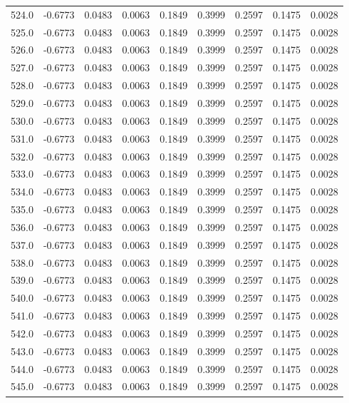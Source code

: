 \begin{longtable}{lrrrrrrrr}
524.0 & -0.6773 & 0.0483 & 0.0063 & 0.1849 & 0.3999 & 0.2597 & 0.1475 & 0.0028 \\
525.0 & -0.6773 & 0.0483 & 0.0063 & 0.1849 & 0.3999 & 0.2597 & 0.1475 & 0.0028 \\
526.0 & -0.6773 & 0.0483 & 0.0063 & 0.1849 & 0.3999 & 0.2597 & 0.1475 & 0.0028 \\
527.0 & -0.6773 & 0.0483 & 0.0063 & 0.1849 & 0.3999 & 0.2597 & 0.1475 & 0.0028 \\
528.0 & -0.6773 & 0.0483 & 0.0063 & 0.1849 & 0.3999 & 0.2597 & 0.1475 & 0.0028 \\
529.0 & -0.6773 & 0.0483 & 0.0063 & 0.1849 & 0.3999 & 0.2597 & 0.1475 & 0.0028 \\
530.0 & -0.6773 & 0.0483 & 0.0063 & 0.1849 & 0.3999 & 0.2597 & 0.1475 & 0.0028 \\
531.0 & -0.6773 & 0.0483 & 0.0063 & 0.1849 & 0.3999 & 0.2597 & 0.1475 & 0.0028 \\
532.0 & -0.6773 & 0.0483 & 0.0063 & 0.1849 & 0.3999 & 0.2597 & 0.1475 & 0.0028 \\
533.0 & -0.6773 & 0.0483 & 0.0063 & 0.1849 & 0.3999 & 0.2597 & 0.1475 & 0.0028 \\
534.0 & -0.6773 & 0.0483 & 0.0063 & 0.1849 & 0.3999 & 0.2597 & 0.1475 & 0.0028 \\
535.0 & -0.6773 & 0.0483 & 0.0063 & 0.1849 & 0.3999 & 0.2597 & 0.1475 & 0.0028 \\
536.0 & -0.6773 & 0.0483 & 0.0063 & 0.1849 & 0.3999 & 0.2597 & 0.1475 & 0.0028 \\
537.0 & -0.6773 & 0.0483 & 0.0063 & 0.1849 & 0.3999 & 0.2597 & 0.1475 & 0.0028 \\
538.0 & -0.6773 & 0.0483 & 0.0063 & 0.1849 & 0.3999 & 0.2597 & 0.1475 & 0.0028 \\
539.0 & -0.6773 & 0.0483 & 0.0063 & 0.1849 & 0.3999 & 0.2597 & 0.1475 & 0.0028 \\
540.0 & -0.6773 & 0.0483 & 0.0063 & 0.1849 & 0.3999 & 0.2597 & 0.1475 & 0.0028 \\
541.0 & -0.6773 & 0.0483 & 0.0063 & 0.1849 & 0.3999 & 0.2597 & 0.1475 & 0.0028 \\
542.0 & -0.6773 & 0.0483 & 0.0063 & 0.1849 & 0.3999 & 0.2597 & 0.1475 & 0.0028 \\
543.0 & -0.6773 & 0.0483 & 0.0063 & 0.1849 & 0.3999 & 0.2597 & 0.1475 & 0.0028 \\
544.0 & -0.6773 & 0.0483 & 0.0063 & 0.1849 & 0.3999 & 0.2597 & 0.1475 & 0.0028 \\
545.0 & -0.6773 & 0.0483 & 0.0063 & 0.1849 & 0.3999 & 0.2597 & 0.1475 & 0.0028 \\

\end{longtable}
